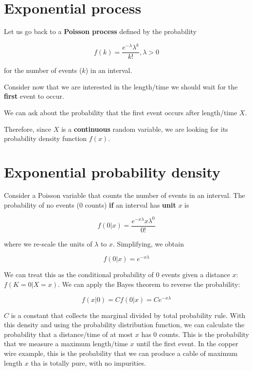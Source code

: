\documentclass[
]{book}
\begin{document}
\hypertarget{exponential-process}{%
\section{Exponential process}\label{exponential-process}}

Let us go back to a \textbf{Poisson process} defined by the probability

\[f(k)=\frac{e^{-\lambda}\lambda^k}{k!}, \lambda>0\]

for the number of events (\(k\)) in an interval.

Consider now that we are interested in the length/time we should wait for the \textbf{first} event to occur.

We can ask about the probability that the first event occurs after length/time \(X\).

Therefore, since \(X\) is a \textbf{continuous} random variable, we are looking for its probability density function \(f(x)\).

\hypertarget{exponential-probability-density}{%
\section{Exponential probability density}\label{exponential-probability-density}}

Consider a Poisson variable that counts the number of events in an interval. The probability of no events (\(0\) counts) \textbf{if} an interval has \textbf{unit} \(x\) is

\[f(0|x)=\frac{e^{-x\lambda}x\lambda^0}{0!}\]

where we re-scale the units of \(\lambda\) to \(x\). Simplifying, we obtain

\[f(0|x)=e^{-x\lambda}\]

We can treat this as the conditional probability of \(0\) events given a distance \(x\): \(f(K=0|X=x)\). We can apply the Bayes theorem to reverse the probability:

\[f(x|0)=C f(0|x)=C e^{-x\lambda}\]

\(C\) is a constant that collects the marginal divided by total probability rule. With this density and using the probability distribution function, we can calculate the probability that a distance/time of at most \(x\) has \(0\) counts. This is the probability that we measure a maximum length/time \(x\) until the first event. In the copper wire example, this is the probability that we can produce a cable of maximum length \(x\) tha is totally pure, with no impurities.
\end{document}
